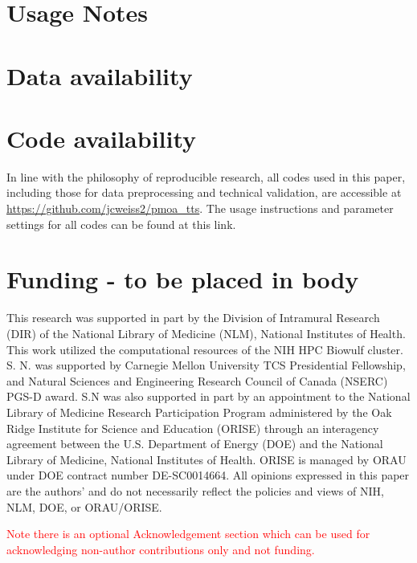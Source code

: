\documentclass[pdflatex,sn-mathphys-num]{sn-jnl}%
\theoremstyle{thmstyleone}%
\theoremstyle{thmstyletwo}%
\theoremstyle{thmstylethree}%
\begin{document}
\section{Usage Notes}\label{sec:usage_notes}


\section{Data availability}\label{sec:data_availability}

\section{Code availability}\label{sec:data_availability}
In line with the philosophy of reproducible research, all codes used in this paper, including those for data preprocessing and technical validation, are accessible at \url{https://github.com/jcweiss2/pmoa_tts}. The usage instructions and parameter settings for all codes can be found at this link.


\section*{Funding - to be placed in body}

This research was supported in part by the Division of Intramural Research (DIR) of the National Library of Medicine (NLM), National Institutes of Health. This work utilized the computational resources of the NIH HPC Biowulf cluster. S. N. was supported by Carnegie Mellon University TCS Presidential Fellowship, and Natural Sciences and Engineering Research Council of Canada (NSERC) PGS-D award. S.N was also supported in part by an appointment to the National Library of Medicine Research Participation Program administered by the Oak Ridge Institute for Science and Education (ORISE) through an interagency agreement between the U.S. Department of Energy (DOE) and the National Library of Medicine, National Institutes of Health. ORISE is managed by ORAU under DOE contract number DE-SC0014664. All opinions expressed in this paper are the authors’ and do not necessarily reflect the policies and views of NIH, NLM, DOE, or ORAU/ORISE.

\noindent \textcolor{red}{Note there is an optional Acknowledgement section which can be used for acknowledging non-author contributions only and not funding.}
\end{document}
